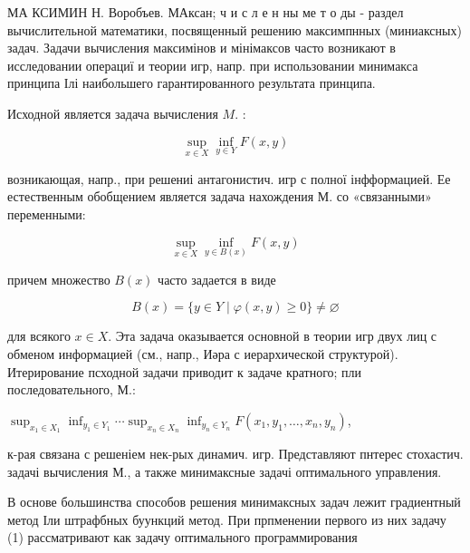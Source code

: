 \documentclass[10pt]{article}
\begin{document}
МА КСИМИН Н. Воробъев. МАксан; ч и с л е н ны ме т о ды - раздел вычислительной математики, посвященный решению максимпнных (миниаксных) задач. Задачи вычисления максимінов и мінімаксов часто возникают в исследовании операциї и теории игр, напр. при использовании минимакса принципа Ілі наибольшего гарантированного результата принципа.



Исходной является задача вычисления $M$. :



\[

\sup _{x \in X} \inf _{y \in Y} F(x, y)

\]



возникающая, напр., при решениі антагонистич. игр с полної інфформацией. Ее естественным обобщением является задача нахождения М. со «связанными» переменными:



\[

\sup _{x \in X} \inf _{y \in B(x)} F(x, y)

\]



причем множество $B(x)$ часто задается в виде



\[

B(x)=\{y \in Y \mid \varphi(x, y) \geqslant 0\} \neq \varnothing

\]



для всякого $x \in X$. Эта задача оказывается основной в теории игр двух лиц с обменом информацией (см., напр., Иәра с иерархической структурой). Итерирование псходной задачи приводит к задаче кратного; пли последовательного, М.:



$\sup _{x_{1} \in X_{1}} \inf _{y_{1} \in Y_{1}} \cdots \sup _{x_{n} \in X_{n}} \inf _{y_{n} \in Y_{n}} F\left(x_{1}, y_{1}, \ldots, x_{n}, y_{n}\right)$,



к-рая связана с решеніем нек-рых динамич. игр. Представляют пнтерес стохастич. задачі вычисления М., а также минимаксные задачі оптимального управления.



В основе большинства способов решения минимаксных задач лежит градиентный метод Іли штрафбных буункций метод. При прпменении первого из них задачу (1) рассматривают как задачу оптимального программирования
\end{document}
